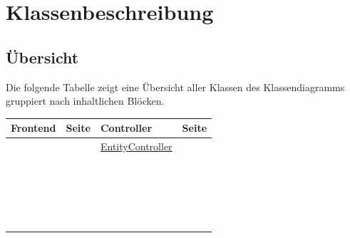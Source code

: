 \section{Klassenbeschreibung}
\subsection{Übersicht}
Die folgende Tabelle zeigt eine Übersicht aller Klassen des Klassendiagramms gruppiert nach inhaltlichen Blöcken.

\begin{table}[htbp]
\begin{tabular}{p{5cm} c | p{5cm} c}
Frontend & Seite & Controller & Seite\\
\hline
\nameref{MainWindow} & \pageref{MainWindow} & \hyperref[entCon]{EntityController} & \pageref{entCon}\\
\nameref{DatastreamWindow} & \pageref{DatastreamWindow} & \nameref{thingCon} & \pageref{thingCon}\\
\nameref{ThingWindow} & \pageref{ThingWindow} & \nameref{dataCon} & \pageref{dataCon}\\
\nameref{SensorWindow} & \pageref{SensorWindow} & \nameref{locCon} & \pageref{locCon}\\
\nameref{LocationWindow} & \pageref{LocationWindow} & \nameref{sensCon} & \pageref{sensCon}\\
\nameref{MagicWindow} & \pageref{MagicWindow} & \nameref{ObsPCon} & \pageref{ObsPCon}\\
\nameref{PropertyWindow} & \pageref{PropertyWindow} & \nameref{ConCon} & \pageref{ConCon}\\
\  &\  & \nameref{ImpCon} & \pageref{ImpCon}\\
\  &\  & \nameref{srcCon} & \pageref{srcCon}\\
\  &\  & \nameref{htmlCon} & \pageref{htmlCon}

\end{tabular}
\end{table}

